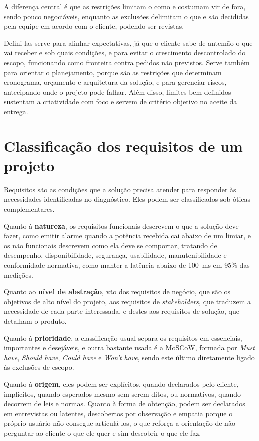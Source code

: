 \documentclass[11pt]{ifscarticle}
\begin{document}
A diferença central é que as restrições limitam o como e costumam vir de
fora, sendo pouco negociáveis, enquanto as exclusões delimitam o que e são
decididas pela equipe em acordo com o cliente, podendo ser revistas.

Defini-las serve para alinhar expectativas, já que o cliente sabe de antemão
o que vai receber e sob quais condições, e para evitar o crescimento
descontrolado do escopo, funcionando como fronteira contra pedidos não
previstos. Serve também para orientar o planejamento, porque são as
restrições que determinam cronograma, orçamento e arquitetura da solução, e
para gerenciar riscos, antecipando onde o projeto pode falhar. Além disso,
limites bem definidos sustentam a criatividade com foco e servem de critério
objetivo no aceite da entrega.

\section{Classificação dos requisitos de um projeto}

Requisitos são as condições que a solução precisa atender para responder às
necessidades identificadas no diagnóstico. Eles podem ser classificados sob
óticas complementares.

Quanto à \textbf{natureza}, os requisitos funcionais descrevem o que a
solução deve fazer, como emitir alarme quando a potência recebida cai abaixo
de um limiar, e os não funcionais descrevem como ela deve se comportar,
tratando de desempenho, disponibilidade, segurança, usabilidade,
manutenibilidade e conformidade normativa, como manter a latência abaixo de
100~ms em 95\% das medições.

Quanto ao \textbf{nível de abstração}, vão dos requisitos de negócio, que
são os objetivos de alto nível do projeto, aos requisitos de
\textit{stakeholders}, que traduzem a necessidade de cada parte
interessada, e destes aos requisitos de solução, que detalham o produto.

Quanto à \textbf{prioridade}, a classificação usual separa os requisitos em
essenciais, importantes e desejáveis, e outra bastante usada é a MoSCoW,
formada por \textit{Must have}, \textit{Should have}, \textit{Could have} e
\textit{Won't have}, sendo este último diretamente ligado às exclusões de
escopo.

Quanto à \textbf{origem}, eles podem ser explícitos, quando declarados pelo
cliente, implícitos, quando esperados mesmo sem serem ditos, ou normativos,
quando decorrem de leis e normas. Quanto à forma de obtenção, podem ser
declarados em entrevistas ou latentes, descobertos por observação e empatia
porque o próprio usuário não consegue articulá-los, o que reforça a
orientação de não perguntar ao cliente o que ele quer e sim descobrir o que
ele faz.
\end{document}
